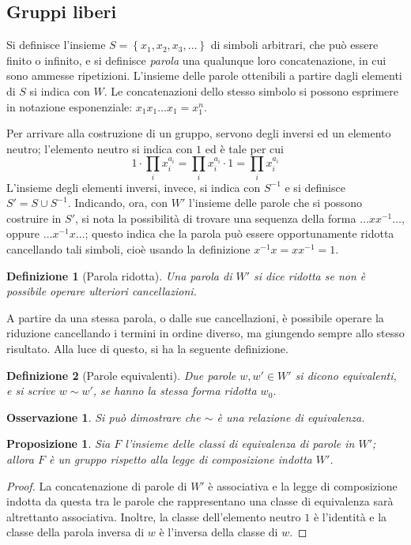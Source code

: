 \documentclass[11pt]{article}
\theoremstyle{style}
\newtheorem{definizione}{Definizione}[section]
\newtheorem{prop}{Proposizione}[section]
\newtheorem{osservazione}{Osservazione}[section]
\numberwithin{equation}{subsection}
\begin{document}
\subsection{Gruppi liberi}
Si definisce l'insieme $S=\left\{ x_1,x_2,x_3,\ldots \right\} $ di simboli arbitrari, che pu\`o essere finito o infinito, e si definisce \textit{parola} una qualunque loro concatenazione, in cui sono ammesse ripetizioni. 
L'insieme delle parole ottenibili a partire dagli elementi di $S$ si indica con $W $.
Le concatenazioni dello stesso simbolo si possono esprimere in notazione esponenziale: $x_1 x_1 \ldots x_1 = x_1^n$.

Per arrivare alla costruzione di un gruppo, servono degli inversi ed un elemento neutro; l'elemento neutro si indica con $1$ ed \`e tale per cui
\[
1 \cdot \prod_{i} x_i^{a_i} = \prod_{i} x_i^{a_i} \cdot 1 = \prod_{i} x_i^{a_i} 
\] 
L'insieme degli elementi inversi, invece, si indica con $S^{-1}$ e si definisce $S' = S \cup S^{-1}$.
Indicando, ora, con $W'$ l'insieme delle parole che si possono costruire in $S'$, si nota la possibilit\`a di trovare una sequenza della forma $\ldots x x^{-1}\ldots$, oppure $\ldots x^{-1}x \ldots$; questo indica che la parola pu\`o essere opportunamente ridotta cancellando tali simboli, cio\`e usando la definizione $x^{-1} x = x x^{-1}= 1$.
\begin{definizione}
	[Parola ridotta]
	Una parola di $W'$ si dice \textit{ridotta} se non \`e possibile operare ulteriori cancellazioni.
\end{definizione}
\noindent A partire da una stessa parola, o dalle sue cancellazioni, \`e possibile operare la riduzione cancellando i termini in ordine diverso, ma giungendo sempre allo stesso risultato.
Alla luce di questo, si ha la seguente definizione.
\begin{definizione}
	[Parole equivalenti]
	Due parole $w, w' \in W'$ si dicono \textit{equivalenti}, e si scrive $w \sim w'$, se hanno la stessa forma ridotta $w_0$.
\end{definizione}
\begin{osservazione}
	Si pu\`o dimostrare che $\sim$ \`e una relazione di equivalenza.
\end{osservazione}
\begin{prop}
	Sia $F$ l'insieme delle classi di equivalenza di parole in $W'$; allora $F$ \`e un gruppo rispetto alla legge di composizione indotta $W'$.
\end{prop}
	\begin{proof}
		La concatenazione di parole di $W'$ \`e associativa e la legge di composizione indotta da questa tra le parole che rappresentano una classe di equivalenza sar\`a altrettanto associativa.
		Inoltre, la classe dell'elemento neutro $1$ \`e l'identit\`a e la classe della parola inversa di $w$ \`e l'inversa della classe di $w$.
	\end{proof}
\end{document}
